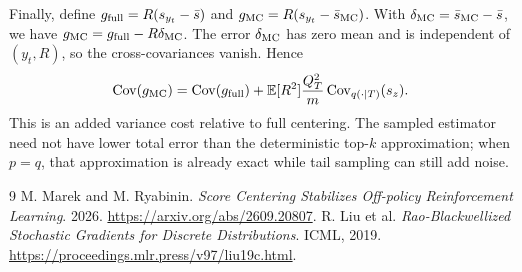 \documentclass[10pt]{article}
\newcommand{\E}{\mathbb{E}}
\newcommand{\Cov}{\operatorname{Cov}}
\begin{document}
Finally, define $g_{\rm full}=R(s_{y_t}-\bar s)$ and $g_{\rm MC}=R(s_{y_t}-\bar s_{\rm MC})$. With $\delta_{\rm MC}=\bar s_{\rm MC}-\bar s$, we have $g_{\rm MC}=g_{\rm full}-R\delta_{\rm MC}$. The error $\delta_{\rm MC}$ has zero mean and is independent of $(y_t,R)$, so the cross-covariances vanish. Hence
\begin{equation}\label{eq:update-variance}
 \Cov(g_{\rm MC})=\Cov(g_{\rm full})
 +\E[R^2]\frac{Q_T^2}{m}\Cov_{q(\cdot\mid T)}(s_z).
\end{equation}
This is an added variance cost relative to full centering. The sampled estimator need not have lower total error than the deterministic top-$k$ approximation; when $p=q$, that approximation is already exact while tail sampling can still add noise.

\begin{thebibliography}{9}
\setlength{\itemsep}{0pt}
 M. Marek and M. Ryabinin. \emph{Score Centering Stabilizes Off-policy Reinforcement Learning}. 2026. \url{https://arxiv.org/abs/2609.20807}.
 R. Liu et al. \emph{Rao-Blackwellized Stochastic Gradients for Discrete Distributions}. ICML, 2019. \url{https://proceedings.mlr.press/v97/liu19c.html}.
\end{thebibliography}
\end{document}
